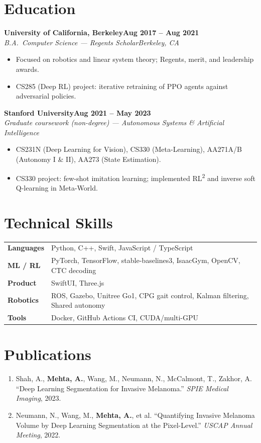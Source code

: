 \documentclass[10pt]{article}
\newcommand{\role}[4]{\textbf{#1}\hfill\textbf{#2}\\\textit{#3}\hfill\textit{#4}}
\begin{document}
\section*{Education}

\role{University of California, Berkeley}{Aug 2017 -- Aug 2021}{B.A.\ Computer Science --- Regents Scholar}{Berkeley, CA}
\begin{itemize}
\item Focused on robotics and linear system theory; Regents, merit, and leadership awards.
\item CS285 (Deep RL) project: iterative retraining of PPO agents against adversarial policies.
\end{itemize}

\role{Stanford University}{Aug 2021 -- May 2023}{Graduate coursework (non-degree) --- Autonomous Systems \& Artificial Intelligence}{}
\begin{itemize}
\item CS231N (Deep Learning for Vision), CS330 (Meta-Learning), AA271A/B (Autonomy I \& II), AA273 (State Estimation).
\item CS330 project: few-shot imitation learning; implemented RL\textsuperscript{2} and inverse soft Q-learning in Meta-World.
\end{itemize}

\section*{Technical Skills}
\begin{tabular}{@{}p{0.9in}l}
\textbf{Languages} & Python, C++, Swift, JavaScript / TypeScript \\
\textbf{ML / RL} & PyTorch, TensorFlow, stable-baselines3, IsaacGym, OpenCV, CTC decoding \\
\textbf{Product} & SwiftUI, Three.js \\
\textbf{Robotics} & ROS, Gazebo, Unitree Go1, CPG gait control, Kalman filtering, Shared autonomy \\
\textbf{Tools} & Docker, GitHub Actions CI, CUDA/multi-GPU \\
\end{tabular}

\section*{Publications}
\begin{enumerate}[leftmargin=1.4em,itemsep=1pt,topsep=1pt]
\item Shah, A., \textbf{Mehta, A.}, Wang, M., Neumann, N., McCalmont, T., Zakhor, A. ``Deep Learning Segmentation for Invasive Melanoma.'' \textit{SPIE Medical Imaging}, 2023.
\item Neumann, N., Wang, M., \textbf{Mehta, A.}, et al. ``Quantifying Invasive Melanoma Volume by Deep Learning Segmentation at the Pixel-Level.'' \textit{USCAP Annual Meeting}, 2022.
\end{enumerate}
\end{document}
